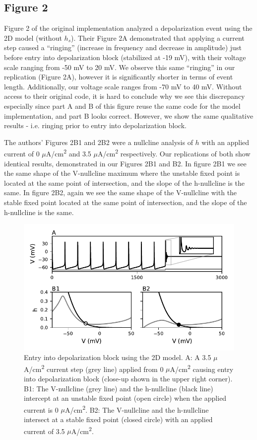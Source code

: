 \subsection{Figure 2}

Figure 2 of the original implementation analyzed a depolarization event using the 2D model (without $h_s$). Their Figure 2A demonstrated that applying a current step caused a ``ringing'' (increase in frequency and decrease in amplitude) just before entry into depolarization block (stabilized at -19 mV), with their voltage scale ranging from -50 mV to 20 mV. We observe this same ``ringing'' in our replication (Figure 2A), however it is significantly shorter in terms of event length. Additionally, our voltage scale ranges from -70 mV to 40 mV. Without access to their original code, it is hard to conclude why we see this discrepancy especially since part A and B of this figure reuse the same code for the model implementation, and part B looks correct. However, we show the same qualitative results - i.e. ringing prior to entry into depolarization block.

The authors' Figures 2B1 and 2B2 were a nullcline analysis of $h$ with an applied current of 0 $\mu$A/cm\textsuperscript{2} and 3.5 $\mu$A/cm\textsuperscript{2} respectively. Our replications of both show identical results, demonstrated in our Figures 2B1 and B2. In figure 2B1 we see the same shape of the V-nullcline maximum where the unstable fixed point is located at the same point of intersection, and the slope of the h-nullcline is the same. In figure 2B2, again we see the same shape of the V-nullcline with the stable fixed point located at the same point of intersection, and the slope of the h-nullcline is the same.

\begin{figure}
	\centering
	\includegraphics[scale=0.7]{../figures/figure_2.pdf}
	\caption{Entry into depolarization block using the 2D model. A: A 3.5 $\mu$A/cm\textsuperscript{2} current step (grey line) applied from 0 $\mu$A/cm\textsuperscript{2} causing entry into depolarization block (close-up shown in the upper right corner). B1: The V-nullcline (grey line) and the h-nullcline (black line) intercept at an unstable fixed point (open circle) when the applied current is 0 $\mu$A/cm\textsuperscript{2}. B2: The V-nullcline and the h-nullcline intersect at a stable fixed point (closed circle) with an applied current of 3.5 $\mu$A/cm\textsuperscript{2}.}
	\label{fig:2}
\end{figure}

